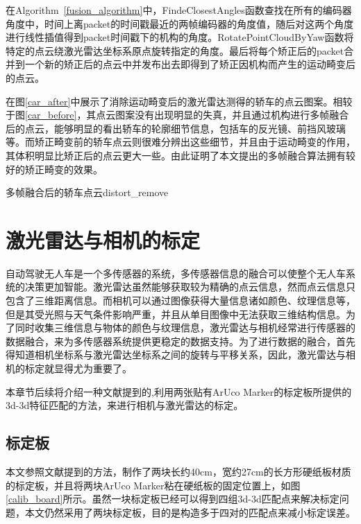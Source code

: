 在Algorithm~\ref{fusion_algorithm}中，FindeClosestAngles函数查找在所有的编码器角度中，时间上离packet的时间戳最近的两帧编码器的角度值，随后对这两个角度进行线性插值得到packet时间戳下的机构的角度。RotatePointCloudByYaw函数将特定的点云绕激光雷达坐标系原点旋转指定的角度。最后将每个矫正后的packet合并到一个新的矫正后的点云中并发布出去即得到了矫正因机构而产生的运动畸变后的点云。

在图\ref{car_after}中展示了消除运动畸变后的激光雷达测得的轿车的点云图案。相较于图\ref{car_before}，其点云图案没有出现明显的失真，并且通过机构进行多帧融合后的点云，能够明显的看出轿车的轮廓细节信息，包括车的反光镜、前挡风玻璃等。而矫正畸变前的轿车点云则很难分辨出这些细节，并且由于运动畸变的作用，其体积明显比矫正后的点云更大一些。由此证明了本文提出的多帧融合算法拥有较好的矫正畸变的效果。

\begin{pics}[htbp]{多帧融合后的轿车点云}{distort_remove}
\end{pics}

\section{激光雷达与相机的标定}

自动驾驶无人车是一个多传感器的系统，多传感器信息的融合可以使整个无人车系统的决策更加智能。激光雷达虽然能够获取较为精确的点云信息，然而点云信息只包含了三维距离信息。而相机可以通过图像获得大量信息诸如颜色、纹理信息等，但是其受光照与天气条件影响严重，并且从单目图像中无法获取三维结构信息。为了同时收集三维信息与物体的颜色与纹理信息，激光雷达与相机经常进行传感器的数据融合，来为多传感器系统提供更稳定的数据支持。为了进行数据的融合，首先得知道相机坐标系与激光雷达坐标系之间的旋转与平移关系，因此，激光雷达与相机的标定就显得尤为重要了。

本章节后续将介绍一种文献提到的,利用两张贴有ArUco Marker的标定板所提供的3d-3d特征匹配的方法，来进行相机与激光雷达的标定。

\subsection{标定板}

本文参照文献提到的方法，制作了两块长约40cm，宽约27cm的长方形硬纸板材质的标定板，并且将两块ArUco Marker粘在硬纸板的固定位置上，如图\ref{calib_board}所示。虽然一块标定板已经可以得到四组3d-3d匹配点来解决标定问题，本文仍然采用了两块标定板，目的是构造多于四对的匹配点来减小标定误差。

